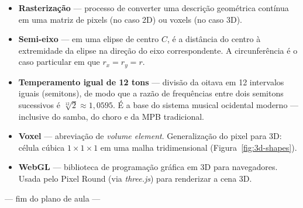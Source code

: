 \documentclass[12pt,a4paper]{scrartcl}
\newcommand{\acc}[1]{\textcolor{accent}{\textbf{#1}}}
\begin{document}
\begin{itemize}[leftmargin=1.4em,itemsep=0.3em,topsep=0.3em]
  \item \acc{Rasterização} --- processo de converter uma descrição geométrica contínua em uma matriz de pixels (no caso 2D) ou voxels (no caso 3D).
  \item \acc{Semi-eixo} --- em uma elipse de centro $C$, é a distância do centro à extremidade da elipse na direção do eixo correspondente. A circunferência é o caso particular em que $r_x = r_y = r$.
  \item \acc{Temperamento igual de 12 tons} --- divisão da oitava em 12 intervalos iguais (semitons), de modo que a razão de frequências entre dois semitons sucessivos é $\sqrt[12]{2} \approx 1{,}0595$. É a base do sistema musical ocidental moderno --- inclusive do samba, do choro e da MPB tradicional.
  \item \acc{Voxel} --- abreviação de \emph{volume element}. Generalização do pixel para 3D: célula cúbica $1 \times 1 \times 1$ em uma malha tridimensional (Figura~\ref{fig:3d-shapes}).
  \item \acc{WebGL} --- biblioteca de programação gráfica em 3D para navegadores. Usada pelo Pixel Round (via \emph{three.js}) para renderizar a cena 3D.
\end{itemize}

\vspace{2em}
\begin{center}
\color{muted}\small\sffamily
--- fim do plano de aula ---
\end{center}
\end{document}
